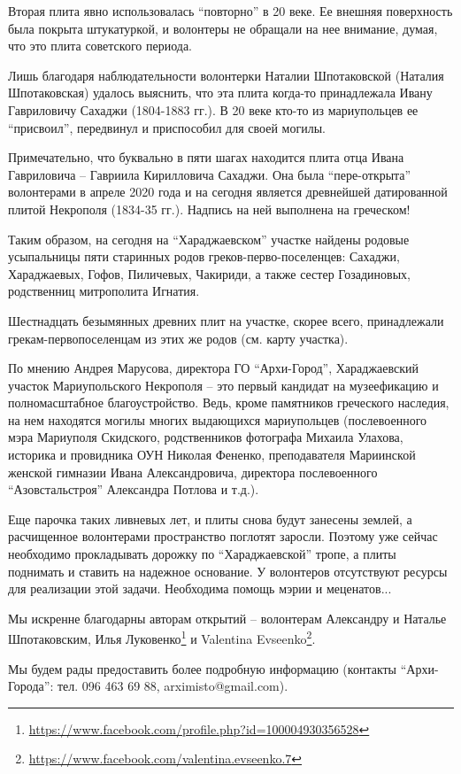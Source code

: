 Вторая плита явно использовалась \enquote{повторно} в 20 веке. Ее внешняя поверхность
была покрыта штукатуркой, и волонтеры не обращали на нее внимание, думая, что
это плита советского периода.

Лишь благодаря наблюдательности волонтерки Наталии Шпотаковской (Наталия
Шпотаковская) удалось выяснить, что эта плита когда-то принадлежала Ивану
Гавриловичу Сахаджи (1804-1883 гг.). В 20 веке кто-то из мариупольцев ее
\enquote{присвоил}, передвинул и приспособил для своей могилы.

Примечательно, что буквально в пяти шагах находится плита отца Ивана
Гавриловича – Гавриила Кирилловича Сахаджи. Она была \enquote{пере-открыта} волонтерами
в апреле 2020 года и на сегодня является древнейшей датированной плитой
Некрополя (1834-35 гг.). Надпись на ней выполнена на греческом!

Таким образом, на сегодня на \enquote{Хараджаевском} участке найдены родовые
усыпальницы пяти старинных родов греков-перво\hyp{}поселенцев: Сахаджи, Хараджаевых,
Гофов, Пиличевых, Чакириди, а также сестер Гозадиновых, родственниц митрополита
Игнатия.

Шестнадцать безымянных древних плит на участке, скорее всего, принадлежали
грекам-первопоселенцам из этих же родов (см. карту участка). 

\begin{leftbar}
По мнению Андрея Марусова, директора ГО \enquote{Архи-Город}, Хараджаевский участок
Мариупольского Некрополя – это первый кандидат на музеефикацию и
полномасштабное благоустройство. Ведь, кроме памятников греческого
наследия, на нем находятся могилы многих выдающихся мариупольцев
(послевоенного мэра Мариуполя Скидского, родственников фотографа Михаила
Улахова, историка и провидника ОУН Николая Фененко, преподавателя
Мариинской женской гимназии Ивана Александровича, директора послевоенного
\enquote{Азовстальстроя} Александра Потлова и т.д.). 

Еще парочка таких ливневых лет, и плиты снова будут занесены землей, а
расчищенное волонтерами пространство поглотят заросли. Поэтому уже сейчас
необходимо прокладывать дорожку по \enquote{Хараджаевской} тропе, а плиты поднимать
и ставить на надежное основание. У волонтеров отсутствуют ресурсы для
реализации этой задачи. Необходима помощь мэрии и меценатов... 
\end{leftbar}

\begin{minipage}{0.9\textwidth}
Мы искренне благодарны авторам открытий – волонтерам Александру и Наталье
Шпотаковским, Илья Луковенко\footnote{\url{https://www.facebook.com/profile.php?id=100004930356528}} и 
Valentina Evseenko\footnote{\url{https://www.facebook.com/valentina.evseenko.7}}.

Мы будем рады предоставить более подробную информацию (контакты
\enquote{Архи-Города}: тел. 096 463 69 88, arximisto@gmail.com).
\end{minipage}
